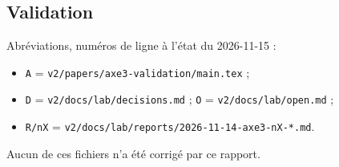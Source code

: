 \subsection{Validation}\label{val:ann}
\begingroup\setlength{\emergencystretch}{3em}%

Abréviations, numéros de ligne à l'état du 2026-11-15 :
\begin{itemize}
  \item \texttt{A} = \texttt{v2/papers/axe3-validation/main.tex} ;
  \item \texttt{D} = \texttt{v2/docs/lab/decisions.md} ; \texttt{O} = \texttt{v2/docs/lab/open.md} ;
  \item \texttt{R/nX} = \texttt{v2/docs/lab/reports/2026-11-14-axe3-nX-*.md}.
\end{itemize}
Aucun de ces fichiers n'a été corrigé par ce rapport.

